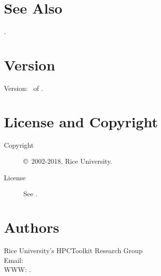 \documentclass[english]{article}
\begin{document}


\section{See Also}

.

\section{Version}

Version: \Version\ of \Date.

\section{License and Copyright}

\begin{description}
\item[Copyright] \copyright\ 2002-2018, Rice University.
\item[License] See .
\end{description}

\section{Authors}

\noindent
Rice University's HPCToolkit Research Group \\
Email:  \\
WWW: .

\LatexManEnd
\end{document}
